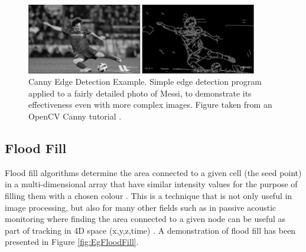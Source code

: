 \begin{figure}[H]
    \begin{center}
      \includegraphics[width=0.9\textwidth]{Figures/canny2.png}
      \caption[Canny Edge Detection Example]{Canny Edge Detection Example. Simple edge detection program applied to a fairly detailed photo of Messi, to demonstrate its effectiveness even with more complex images. Figure taken from an OpenCV Canny tutorial \cite{Canny1Source}.}
      \label{fig:canny1}
    \end{center}
\end{figure}

\subsection{Flood Fill}

Flood fill algorithms determine the area connected to a given cell (the seed point) in a multi-dimensional array that have similar intensity values for the purpose of filling them with a chosen colour \cite{FloodFill}. This is a technique that is not only useful in image processing, but also for many other fields such as in passive acoustic monitoring where finding the area connected to a given node can be useful as part of tracking in 4D space (x,y,z,time) \cite{nosal2008flood}. A demonstration of flood fill has been presented in Figure \ref{fig:EgFloodFill}.


